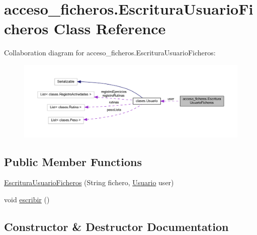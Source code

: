 \hypertarget{classacceso__ficheros_1_1_escritura_usuario_ficheros}{}\section{acceso\+\_\+ficheros.\+Escritura\+Usuario\+Ficheros Class Reference}
\label{classacceso__ficheros_1_1_escritura_usuario_ficheros}


Collaboration diagram for acceso\+\_\+ficheros.\+Escritura\+Usuario\+Ficheros\+:
\nopagebreak
\begin{figure}[H]
\begin{center}
\leavevmode
\includegraphics[width=350pt]{classacceso__ficheros_1_1_escritura_usuario_ficheros__coll__graph}
\end{center}
\end{figure}
\subsection*{Public Member Functions}
\begin{DoxyCompactItemize}
\item 
\mbox{\hyperlink{classacceso__ficheros_1_1_escritura_usuario_ficheros_ab541baaa91654ca92d2e77a7d70ba2f9}{Escritura\+Usuario\+Ficheros}} (String fichero, \mbox{\hyperlink{classclases_1_1_usuario}{Usuario}} user)
\item 
void \mbox{\hyperlink{classacceso__ficheros_1_1_escritura_usuario_ficheros_a4e2e757d274f78e6c2bee2f36fc61afd}{escribir}} ()
\end{DoxyCompactItemize}


\subsection{Constructor \& Destructor Documentation}
\mbox{\label{classacceso__ficheros_1_1_escritura_usuario_ficheros_ab541baaa91654ca92d2e77a7d70ba2f9}} 
